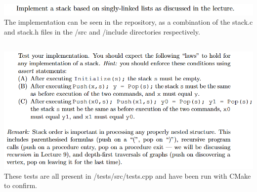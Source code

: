\documentclass{article}
\begin{document}
\subsection{}
\includegraphics[width=\linewidth, keepaspectratio=true]{task2a}
The implementation can be seen in the repository, as a combination of the stack.c and stack.h files in the /src and /include directories respectively.

\subsection{}
\includegraphics[width=\linewidth, keepaspectratio=true]{task2b} 
These tests are all present in /tests/src/tests.cpp and have been run with CMake to confirm.
\end{document}
